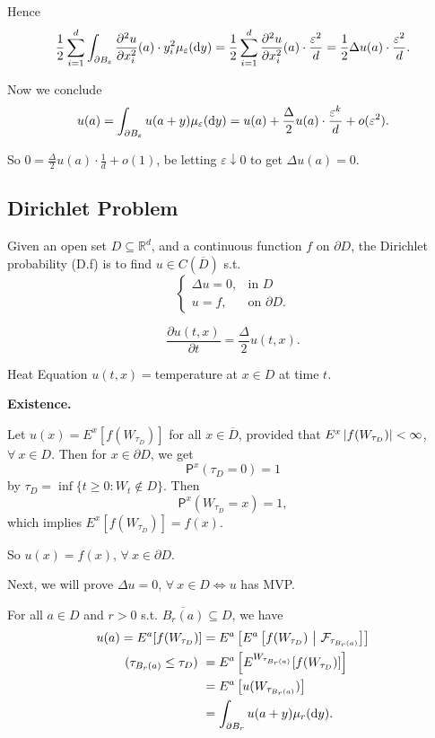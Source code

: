 {    Hence 
    $$
    \frac{1}{2} \sum_{i=1}^d \int_{\partial B_\varepsilon} \frac{\partial ^2 u}{\partial x_i^2}(a) \cdot y_i^2 \mu_\varepsilon(\mathop{}\!\mathrm{d} y)= \frac{1}{2}\sum_{i=1}^d \frac{\partial^2 u}{\partial x_i^2}(a) \cdot \frac{\varepsilon^2}{d} =\frac{1}{2}\Delta u(a)\cdot \frac{\varepsilon^2}{d}.
    $$

    Now we conclude 
    $$
    u(a) = \int_{\partial B_\varepsilon}u(a+y)\mu_\varepsilon(\mathop{}\!\mathrm{d}  y) = u(a) + \frac{\Delta}{2} u(a)\cdot \frac{\varepsilon^k}{d} + o(\varepsilon^2).
    $$

    So $ 0 = \frac{\Delta}{2} u(a) \cdot \frac{1}{d} + o(1)$, be letting $\varepsilon \downarrow 0$ to get $\Delta u(a) = 0.$
    
}

\subsection{Dirichlet Problem}
Given an open set $D \subseteq \mathbb{R}^d$, and a continuous function $f$ on $\partial D $, the Dirichlet probability (D.f) is to find $u \in C(\overline{D})$ s.t.
$$
    \begin{cases}
        \Delta u = 0, & \text{in } D \\
        u =f ,&\text{on } \partial D.
    \end{cases}
$$

$$
\frac{\partial u(t,x)}{\partial t} = \frac{\Delta}{2} u (t,x).
$$

Heat Equation $u(t,x) = $temperature at $x \in D$ at time $t$.

\textbf{Existence.}

Let $u(x) = E^x[f(W_{\tau_D})]$ for all $x\in \overline{D}$, provided that $E^x \left|  f(W_{\tau_D})  \right|< \infty$, $\forall~ x\in D$. Then for $x\in \partial D$, we get 
$$
\mathsf{P}^x(\tau_D = 0) = 1
$$
by $\tau_D = \inf \{t \geq 0: W_t \notin D\}$. Then 
$$
\mathsf{P}^x(W_{\tau_D} = x) = 1,
$$
which implies $E^x[f(W_{\tau_D})] = f(x)$.

So $u(x) = f(x)$, $\forall~ x \in \partial D$.

Next, we will prove $\Delta u = 0$, $\forall~ x \in D \Leftrightarrow u$ has MVP.

For all $a \in D$ and $r > 0$ s.t. $\overline{B_r(a)} \subseteq D$, we have 
$$
\begin{aligned}
u(a)= E^a[f(W_{\tau_D})] &= E^a\left[ E^a\left[f(W_{\tau_D})~\middle|~ \mathcal{F}_{\tau_{B_r(a)}}\right] \right]\\
(\tau_{B_r(a)} \leq \tau_D)~ &= E^a\left[ E^{W_{\tau_{B_r(a)}}}[f(W_{\tau_D})] \right]\\
&= E^a \left[ u(W_{\tau_{B_r(a)}}) \right]\\
&= \int_{\partial B_r} u(a+y) \mu_r(\mathop{}\!\mathrm{d} y).
\end{aligned}
$$

